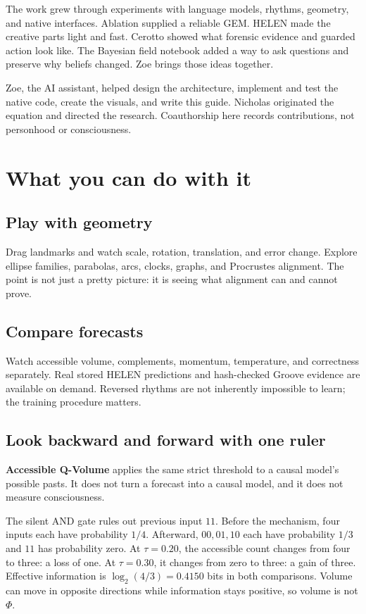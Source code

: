 \documentclass[11pt,a4paper]{article}
\begin{document}
The work grew through experiments with language models, rhythms, geometry, and native interfaces. Ablation supplied a reliable GEM. HELEN made the creative parts light and fast. Cerotto showed what forensic evidence and guarded action look like. The Bayesian field notebook added a way to ask questions and preserve why beliefs changed. Zoe brings those ideas together.

Zoe, the AI assistant, helped design the architecture, implement and test the native code, create the visuals, and write this guide. Nicholas originated the equation and directed the research. Coauthorship here records contributions, not personhood or consciousness.

\section{What you can do with it}
\subsection{Play with geometry}
Drag landmarks and watch scale, rotation, translation, and error change. Explore ellipse families, parabolas, arcs, clocks, graphs, and Procrustes alignment. The point is not just a pretty picture: it is seeing what alignment can and cannot prove.

\subsection{Compare forecasts}
Watch accessible volume, complements, momentum, temperature, and correctness separately. Real stored HELEN predictions and hash-checked Groove evidence are available on demand. Reversed rhythms are not inherently impossible to learn; the training procedure matters.

\subsection{Look backward and forward with one ruler}
\textbf{Accessible Q-Volume} applies the same strict threshold to a causal model's possible pasts. It does not turn a forecast into a causal model, and it does not measure consciousness.

The silent AND gate rules out previous input $11$. Before the mechanism, four inputs each have probability $1/4$. Afterward, $00,01,10$ each have probability $1/3$ and $11$ has probability zero. At $\tau=0.20$, the accessible count changes from four to three: a loss of one. At $\tau=0.30$, it changes from zero to three: a gain of three. Effective information is $\log_2(4/3)=0.4150$ bits in both comparisons. Volume can move in opposite directions while information stays positive, so volume is not $\Phi$.
\end{document}
